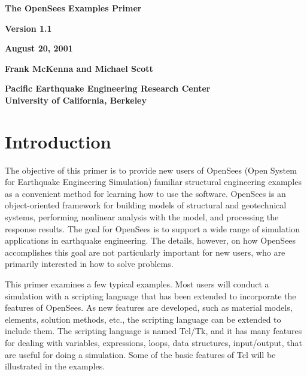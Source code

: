\documentclass[12pt]{article}
\begin{document}


\begin{center}
{\bf \Large The OpenSees Examples Primer} 

{\bf Version 1.1 } 

{\bf  August 20, 2001} 

{\bf  Frank McKenna and Michael Scott} 

{\bf  Pacific Earthquake Engineering Research Center \\ 
University of California, Berkeley}
\end{center}

\vspace{.2in}
\section*{Introduction}
The objective of this primer is to provide new users of OpenSees
(Open System for Earthquake Engineering Simulation) familiar 
structural engineering examples as a convenient method for learning
how to use the software. OpenSees is an object-oriented framework for
building models of structural and geotechnical systems, performing
nonlinear analysis with the model, and processing the response
results. The goal for OpenSees is to support a wide range of
simulation applications in earthquake engineering.
The details, however, on how OpenSees accomplishes this goal are
not particularly important for new users, who are primarily interested
in how to solve problems.

This primer examines a few typical examples.  Most users will conduct
a simulation with a scripting language that has been extended to
incorporate the features of OpenSees. As new features are developed,
such as material models, elements, solution methods, etc., the
scripting language can be extended to include them. The scripting
language is named Tcl/Tk, and it has many features for dealing with
variables, expressions, loops, data structures, input/output, that are useful for
doing a simulation.  Some of the basic features of Tcl will be illustrated in
the examples.
\end{document}
